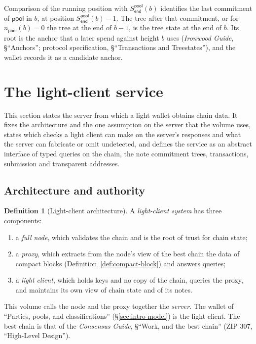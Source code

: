 \documentclass[11pt,a4paper]{article}
\theoremstyle{definition}
\newtheorem{definition}[theorem]{Definition}
\begin{document}
Comparison of the running position with $S^{\mathsf{pool}}_{\mathsf{end}}(b)$
identifies the last commitment of $\mathsf{pool}$ in $b$, at position
$S^{\mathsf{pool}}_{\mathsf{end}}(b) - 1$. The tree after that commitment,
or for $n_{\mathsf{pool}}(b) = 0$ the tree at the end of $b - 1$, is the
tree state at the end of $b$. Its root is the anchor that a later spend
against height $b$ uses (\emph{Ironwood Guide}, \S``Anchors''; protocol
specification, \S``Transactions and Treestates''), and the wallet records
it as a candidate anchor.

\section{The light-client service}\label{sec:sync-service}

This section states the server from which a light wallet obtains chain data.
It fixes the architecture and the one assumption on the server that the
volume uses, states which checks a light client can make on the server's
responses and what the server can fabricate or omit undetected, and defines
the service as an abstract interface of typed queries on the chain, the note
commitment trees, transactions, submission and transparent addresses.

\subsection{Architecture and authority}\label{sec:service-trust}

\begin{definition}[Light-client architecture]\label{def:service-arch}
A \emph{light-client system} has three components:
\begin{enumerate}
\item a \emph{full node}, which validates the chain and is the root of trust
  for chain state;
\item a \emph{proxy}, which extracts from the node's view of the best chain
  the data of compact blocks (Definition~\ref{def:compact-block}) and
  answers queries;
\item a \emph{light client}, which holds keys and no copy of the chain,
  queries the proxy, and maintains its own view of chain state and of its
  notes.
\end{enumerate}
This volume calls the node and the proxy together the \emph{server}. The
wallet of ``Parties, pools, and classifications'' (\S\ref{sec:intro-model})
is the light client. The best chain is that of the \emph{Consensus Guide},
\S``Work, and the best chain'' (ZIP 307, ``High-Level Design'').
\end{definition}
\end{document}
